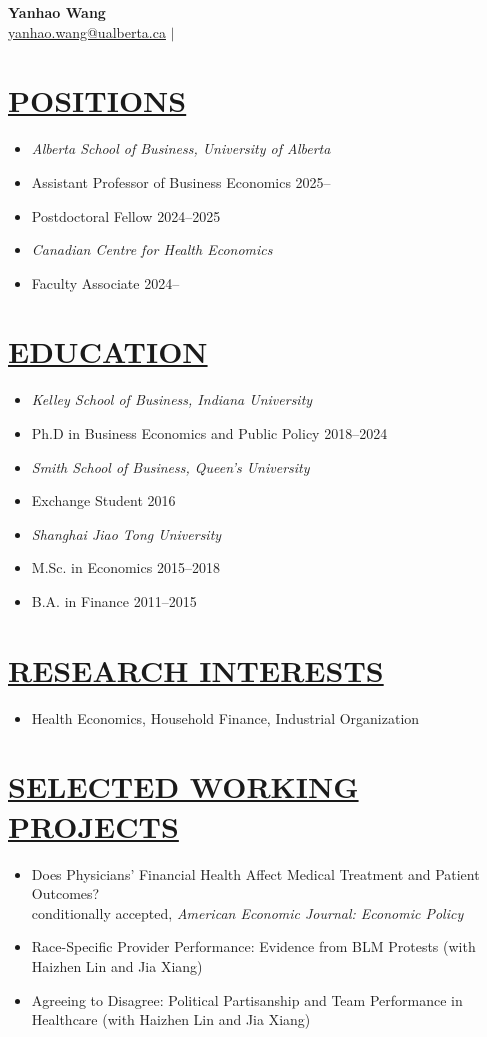 \documentclass{res}
\newcommand{\sectionbodyspace}{\vspace{1.5em}}
\newenvironment{cvitems}{%
  \begin{itemize}[leftmargin=15pt,labelindent=-15pt,itemindent=-15pt,itemsep=0.2em]
}{%
  \end{itemize}
}
\newcommand{\cvitem}[1]{\item[] #1}
\newcommand{\cvgroup}[1]{\item[] \textit{#1}}
\newcommand{\cvdated}[2]{\item[] \hspace{13pt} #1 \hfill #2}
\begin{document}
\begin{resume}

\vspace{-50pt}

\begin{center}
  {\huge \textbf{Yanhao Wang}} \\ \vspace{5pt}
  \href{mailto:yanhao.wang@ualberta.ca}{\small \textsf{yanhao.wang@ualberta.ca}} \quad $\vert$ 
\end{center}

\vspace{3pt}

\section{\large{\ul{POSITIONS}}}
\sectionbodyspace
\begin{cvitems}
  \cvgroup{Alberta School of Business, University of Alberta}
  \cvdated{Assistant Professor of Business Economics}{2025--}
  \cvdated{Postdoctoral Fellow}{2024--2025}
  \cvgroup{Canadian Centre for Health Economics}
  \cvdated{Faculty Associate}{2024--}
\end{cvitems}

\section{\large{\ul{EDUCATION}}}
\sectionbodyspace
\begin{cvitems}
  \cvgroup{Kelley School of Business, Indiana University}
  \cvdated{Ph.D in Business Economics and Public Policy}{2018--2024}
  \cvgroup{Smith School of Business, Queen's University}
  \cvdated{Exchange Student}{2016}
  \cvgroup{Shanghai Jiao Tong University}
  \cvdated{M.Sc. in Economics}{2015--2018}
  \cvdated{B.A. in Finance}{2011--2015}
\end{cvitems}

\section{\large{\ul{RESEARCH INTERESTS}}}
\sectionbodyspace
\begin{cvitems}
  \cvitem{Health Economics, Household Finance, Industrial Organization}
\end{cvitems}

\section{\large{\ul{SELECTED WORKING PROJECTS}}}
\sectionbodyspace
\begin{cvitems}
    \cvitem{Does Physicians' Financial Health Affect Medical Treatment and Patient Outcomes? \\
    conditionally accepted, \textit{American Economic Journal: Economic Policy}}
    \cvitem{Race-Specific Provider Performance: Evidence from BLM Protests (with Haizhen Lin and Jia Xiang)}
    \cvitem{Agreeing to Disagree: Political Partisanship and Team Performance in Healthcare (with Haizhen Lin and Jia Xiang)}
\end{cvitems}


\end{resume}
\end{document}
